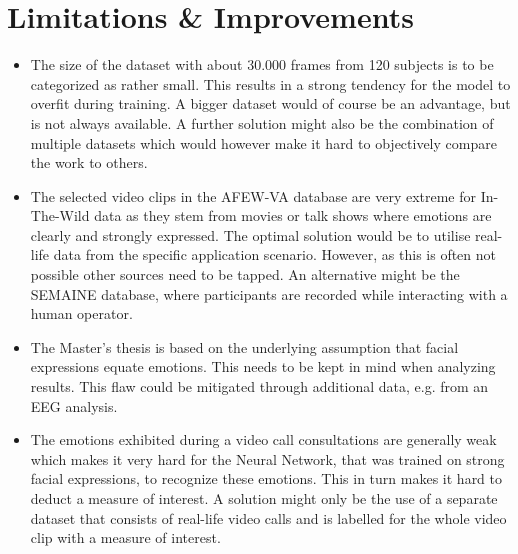 \section{Limitations \& Improvements}
\begin{itemize}
    \item The size of the dataset with about 30.000 frames from 120 subjects is to be categorized as rather small. This results in a strong tendency for the model to overfit during training. A bigger dataset would of course be an advantage, but is not always available. A further solution might also be the combination of multiple datasets which would however make it hard to objectively compare the work to others.
    \item The selected video clips in the AFEW-VA database are very extreme for In-The-Wild data as they stem from movies or talk shows where emotions are clearly and strongly expressed. The optimal solution would be to utilise real-life data from the specific application scenario. However, as this is often not possible other sources need to be tapped. An alternative might be the SEMAINE database, where participants are recorded while interacting with a human operator.
    \item The Master's thesis is based on the underlying assumption that facial expressions equate emotions. This needs to be kept in mind when analyzing results. This flaw could be mitigated through additional data, e.g. from an EEG analysis.
    \item The emotions exhibited during a video call consultations are generally weak which makes it very hard for the Neural Network, that was trained on strong facial expressions, to recognize these emotions. This in turn makes it hard to deduct a measure of interest. A solution might only be the use of a separate dataset that consists of real-life video calls and is labelled for the whole video clip with a measure of interest.
\end{itemize}


